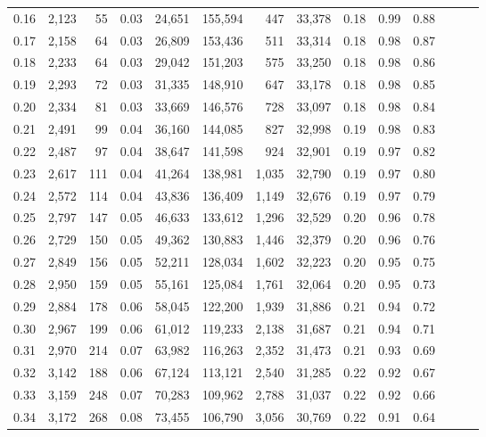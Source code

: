\begin{tabular}{rrrrrrrrrrrrrr}
0.16 &  2,123 &   55 &  0.03 &   24,651 &  155,594 &     447 &  33,378 &  0.18 &  0.99 &      0.88 \\
0.17 &  2,158 &   64 &  0.03 &   26,809 &  153,436 &     511 &  33,314 &  0.18 &  0.98 &      0.87 \\
0.18 &  2,233 &   64 &  0.03 &   29,042 &  151,203 &     575 &  33,250 &  0.18 &  0.98 &      0.86 \\
0.19 &  2,293 &   72 &  0.03 &   31,335 &  148,910 &     647 &  33,178 &  0.18 &  0.98 &      0.85 \\
0.20 &  2,334 &   81 &  0.03 &   33,669 &  146,576 &     728 &  33,097 &  0.18 &  0.98 &      0.84 \\
0.21 &  2,491 &   99 &  0.04 &   36,160 &  144,085 &     827 &  32,998 &  0.19 &  0.98 &      0.83 \\
0.22 &  2,487 &   97 &  0.04 &   38,647 &  141,598 &     924 &  32,901 &  0.19 &  0.97 &      0.82 \\
0.23 &  2,617 &  111 &  0.04 &   41,264 &  138,981 &   1,035 &  32,790 &  0.19 &  0.97 &      0.80 \\
0.24 &  2,572 &  114 &  0.04 &   43,836 &  136,409 &   1,149 &  32,676 &  0.19 &  0.97 &      0.79 \\
0.25 &  2,797 &  147 &  0.05 &   46,633 &  133,612 &   1,296 &  32,529 &  0.20 &  0.96 &      0.78 \\
0.26 &  2,729 &  150 &  0.05 &   49,362 &  130,883 &   1,446 &  32,379 &  0.20 &  0.96 &      0.76 \\
0.27 &  2,849 &  156 &  0.05 &   52,211 &  128,034 &   1,602 &  32,223 &  0.20 &  0.95 &      0.75 \\
0.28 &  2,950 &  159 &  0.05 &   55,161 &  125,084 &   1,761 &  32,064 &  0.20 &  0.95 &      0.73 \\
0.29 &  2,884 &  178 &  0.06 &   58,045 &  122,200 &   1,939 &  31,886 &  0.21 &  0.94 &      0.72 \\
0.30 &  2,967 &  199 &  0.06 &   61,012 &  119,233 &   2,138 &  31,687 &  0.21 &  0.94 &      0.71 \\
0.31 &  2,970 &  214 &  0.07 &   63,982 &  116,263 &   2,352 &  31,473 &  0.21 &  0.93 &      0.69 \\
0.32 &  3,142 &  188 &  0.06 &   67,124 &  113,121 &   2,540 &  31,285 &  0.22 &  0.92 &      0.67 \\
0.33 &  3,159 &  248 &  0.07 &   70,283 &  109,962 &   2,788 &  31,037 &  0.22 &  0.92 &      0.66 \\
0.34 &  3,172 &  268 &  0.08 &   73,455 &  106,790 &   3,056 &  30,769 &  0.22 &  0.91 &      0.64 \\

\end{tabular}
